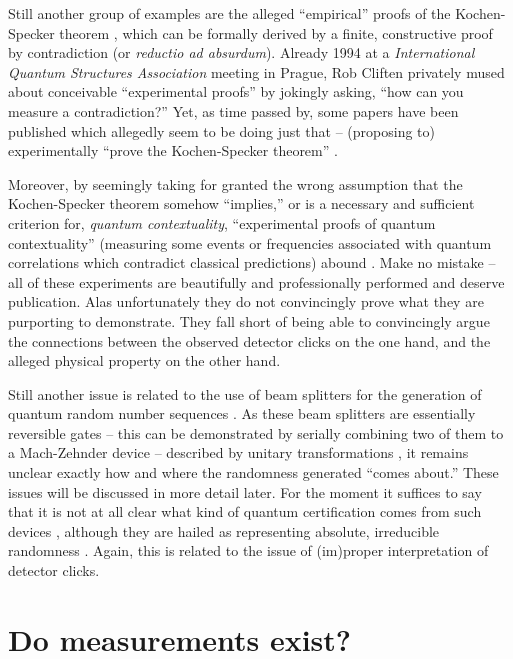 \documentclass[%
 preprint,
 showpacs,
 showkeys,
 preprintnumbers,
 amsmath,amssymb,
 aps,
  pra,
  longbibliography,
 ]{revtex4-1}
\begin{document}
Still another group of examples are the alleged ``empirical'' proofs of the Kochen-Specker theorem \cite{kochen1}, which can be formally derived by a finite, constructive
proof by contradiction (or {\it reductio ad absurdum}).
Already
1994 at a {\it International Quantum Structures Association} meeting in Prague,
Rob Cliften privately mused about conceivable ``experimental proofs'' by jokingly asking, ``how can you measure a contradiction?''
Yet, as time passed by, some papers have been published which allegedly seem to be doing just that -- (proposing to) experimentally
``prove the Kochen-Specker theorem''
\cite{cabello-98,huang-2003}.

Moreover, by seemingly taking for granted the wrong assumption that the Kochen-Specker theorem somehow ``implies,''
or is a necessary and sufficient criterion for, {\em quantum contextuality}, ``experimental proofs of quantum contextuality''
(measuring some events or frequencies associated with quantum correlations which contradict classical predictions)
abound
\cite{hasegawa:230401,cabello:210401,Bartosik-09,kirch-09,PhysRevLett.103.160405,Lapkiewicz-11}.
Make no mistake -- all of these experiments are beautifully and professionally performed and deserve publication.
Alas unfortunately they do not convincingly prove what they are purporting to demonstrate.
They fall short of being able to convincingly argue the connections between the observed detector clicks on the one hand,
and the alleged physical property on the other hand.

Still another issue is related to the use of beam splitters for the generation of quantum random number sequences
\cite{svozil-qct,rarity-94,zeilinger:qct,stefanov-2000}.
As these beam splitters are essentially reversible gates
-- this can be demonstrated by serially combining two of them to a Mach-Zehnder device --
described by unitary transformations \cite{green-horn-zei},
it remains unclear exactly how and where the randomness generated ``comes about.''
These issues will be discussed in more detail later.
For the moment it suffices to say that it is not at all clear what kind of quantum certification comes from such devices \cite{PhysRevA.82.022102},
although they are hailed as representing absolute, irreducible randomness \cite{zeil-05_nature_ofQuantum}.
Again, this is related to the issue of (im)proper interpretation of detector clicks.

\section{Do measurements exist?}
\end{document}
